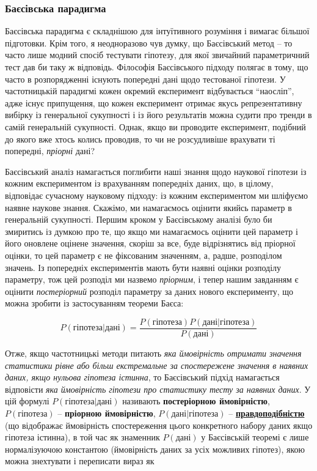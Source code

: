 \documentclass[
  11pt,
]{book}
\begin{document}
\subsubsection{Баєсівська парадигма}\label{ux431ux430ux454ux441ux456ux432ux441ux44cux43aux430-ux43fux430ux440ux430ux434ux438ux433ux43cux430}

Баєсівська парадигма є складнішою для інтуїтивного розуміння і вимагає більшої підготовки. Крім того, я неодноразово чув думку, що Баєсівський метод -- то часто лише модний спосіб тестувати гіпотезу, для якої звичайний параметричний тест дав би таку ж відповідь. Філософія Баєсівського підходу полягає в тому, що часто в розпорядженні існують попередні дані щодо тестованої гіпотези. У частотницькій парадигмі кожен окремий експеримент відбувається ``наосліп'', адже існує припущення, що кожен експеримент отримає якусь репрезентативну вибірку із генеральної сукупності і із його результатів можна судити про тренди в самій генеральній сукупності. Однак, якщо ви проводите експеримент, подібний до якого вже хтось колись проводив, то чи не розсудливіше врахувати ті попередні, \emph{пріорні} дані?

Баєсівський аналіз намагається поглибити наші знання щодо наукової гіпотези із кожним експериментом із врахуванням попередніх даних, що, в цілому, відповідає сучасному науковому підходу: із кожним експериментом ми шліфуємо наявне наукове знання. Скажімо, ми намагаємось оцінити якийсь параметр в генеральній сукупності. Першим кроком у Баєсівському аналізі було би змиритись із думкою про те, що якщо ми намагаємось оцінити цей параметр і його оновлене оцінене значення, скоріш за все, буде відрізнятись від пріорної оцінки, то цей параметр є не фіксованим значенням, а, радше, розподілом значень. Із попередніх експериментів мають бути наявні оцінки розподілу параметру, тож цей розподіл ми назвемо \emph{пріорним}, і тепер нашим завданням є оцінити \emph{постеріорний} розподіл параметру за даних нового експерименту, що можна зробити із застосуванням теореми Баєса:

\[P(\text{гіпотеза}|\text{дані}) = \frac{P(\text{гіпотеза})P(\text{дані}|\text{гіпотеза})}{P(\text{дані})}\]

Отже, якщо частотницькі методи питають \emph{яка ймовірність отримати значення статистики рівне або більш екстремальне за спостережене значення в наявних даних, якщо нульова гіпотеза істинна}, то Баєсівський підхід намагається відповісти \emph{яка ймовірність гіпотези про статистику тесту за наявних даних}. У цій формулі \(P(\text{гіпотеза}|\text{дані})\) називають \textbf{постеріорною ймовірністю}, \(P(\text{гіпотеза})\) -- \textbf{пріорною ймовірністю}, \(P(\text{дані}|\text{гіпотеза})\) -- \textbf{\hyperref[mle]{правдоподібністю}} (що відображає ймовірність спостереження цього конкретного набору даних якщо гіпотеза істинна), в той час як знаменник \(P(\text{дані})\) у Баєсівській теоремі є лише нормалізуючою константою (ймовірність даних за усіх можливих гіпотез), якою можна знехтувати і переписати вираз як
\end{document}
